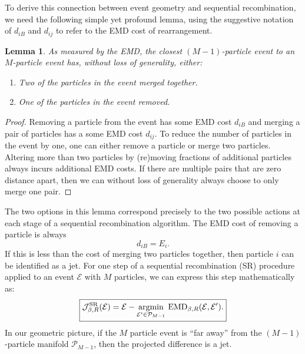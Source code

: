 \documentclass[letterpaper,11pt]{article}
\newtheorem{lemma}{Lemma}
\begin{document}
To derive this connection between event geometry and sequential recombination, we need the following simple yet profound lemma, using the suggestive notation of $d_{iB}$ and $d_{ij}$ to refer to the EMD cost of rearrangement.
%
\begin{lemma}
As measured by the EMD, the closest $(M-1)$-particle event to an $M$-particle event has, without loss of generality, either:
\begin{enumerate}
\item[(a)] Two of the particles in the event merged together.
\item[(b)] One of the particles in the event removed.
\end{enumerate}
\end{lemma}
\begin{proof}
%
Removing a particle from the event has some EMD cost $d_{iB}$ and merging a pair of particles has a some EMD cost $d_{ij}$.
%
To reduce the number of particles in the event by one, one can either remove a particle or merge two particles.
%
Altering more than two particles by (re)moving fractions of additional particles always incurs additional EMD costs.
%
If there are multiple pairs that are zero distance apart, then we can without loss of generality always choose to only merge one pair.
\end{proof}


The two options in this lemma correspond precisely to the two possible actions at each stage of a sequential recombination algorithm.
%
The EMD cost of removing a particle is always
%
\begin{equation}\label{eq:diBemd}
d_{iB} = E_i.
\end{equation}
%
If this is less than the cost of merging two particles together, then particle $i$ can be identified as a jet.
%
For one step of a sequential recombination (SR) procedure applied to an event $\mathcal E$ with $M$ particles, we can express this step mathematically as:
%
\begin{equation}\label{eq:SRasEMD}
\begin{boxed}{
\mathcal J_{\beta, R}^\text{SR}(\mathcal E) = \mathcal E - \underset{\mathcal E' \in \mathcal P_{M-1}}{\text{argmin}}\,\,\text{EMD}_{\beta,R}(\mathcal E, \mathcal E').
}\end{boxed}
\end{equation}
%
In our geometric picture, if the $M$ particle event is ``far away'' from the $(M-1)$-particle manifold $\mathcal P_{M-1}$, then the projected difference is a jet. 
\end{document}
